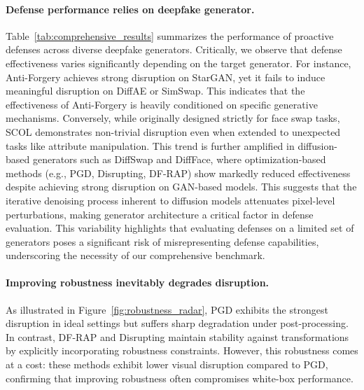 \documentclass{article}
\begin{document}
\paragraph{Defense performance relies on deepfake generator.}
Table~\ref{tab:comprehensive_results} summarizes the performance of proactive defenses across diverse deepfake generators. Critically, we observe that defense effectiveness varies significantly depending on the target generator. For instance, Anti-Forgery achieves strong disruption on StarGAN, yet it fails to induce meaningful disruption on DiffAE or SimSwap. This indicates that the effectiveness of Anti-Forgery is heavily conditioned on specific generative mechanisms. Conversely, while originally designed strictly for face swap tasks, SCOL demonstrates non-trivial disruption even when extended to unexpected tasks like attribute manipulation. This trend is further amplified in diffusion-based generators such as DiffSwap and DiffFace, where optimization-based methods (e.g., PGD, Disrupting, DF-RAP) show markedly reduced effectiveness despite achieving strong disruption on GAN-based models. This suggests that the iterative denoising process inherent to diffusion models attenuates pixel-level perturbations, making generator architecture a critical factor in defense evaluation. This variability highlights that evaluating defenses on a limited set of generators poses a significant risk of misrepresenting defense capabilities, underscoring the necessity of our comprehensive benchmark.

\paragraph{Improving robustness inevitably degrades disruption.}
As illustrated in Figure~\ref{fig:robustness_radar}, PGD exhibits the strongest disruption in ideal settings but suffers sharp degradation under post-processing.  In contrast, DF-RAP and Disrupting maintain stability against transformations by explicitly incorporating robustness constraints. However, this robustness comes at a cost: these methods exhibit lower visual disruption compared to PGD, confirming that improving robustness often compromises white-box performance.
\end{document}
